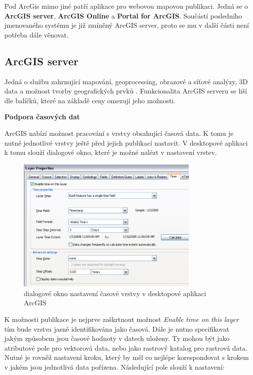 Pod ArcGis mimo jiné patří aplikace pro webovou mapovou publikaci. Jedná se o \textbf{ArcGIS server}, \textbf{ArcGIS Online} a \textbf{Portal for ArcGIS}. Součástí posledního jmenovaného systému je již zmíněný ArcGIS server, proto se mu v další části není potřeba dále věnovat.

\newpage
\subsection{ArcGIS server}

Jedná o službu zahrnující mapování, geoprocessing, obrazové a síťové analýzy, 3D data a možnost tvorby geografických prvků \cite{arcgis-publishing-service}. Funkcionalita ArcGIS serveru se liší dle balíčků, které na základě ceny omezují jeho možnosti.   

\bigskip
\noindent
\textbf{Podpora časových dat}
 
ArcGIS nabízí možnost pracování s vrstvy obsahující časová data. K tomu je nutné jednotlivé vrstvy ještě před jejich publikací nastavit. V desktopové aplikaci k tomu slouží dialogové okno, které je možné nalézt v nastavení vrstev.

\begin{figure}[h!]
	\centering
	\includegraphics[width=0.8\textwidth]{../img/arcgis-layer-edit.png}
	\caption{dialogové okno nastavení časové vrstvy v desktopové aplikaci ArcGIS}
	\label{fig:arcgis-time-settings}
\end{figure}

K možnosti publikace je nejprve zaškrtnout možnost \textit{Enable time on this layer} tím bude vrstva jasně identifikována jako časová. Dále je nutno specifikovat jakým způsobem jsou časové hodnoty v datech uloženy. Ty mohou být jako atributové pole pro vektorová data, nebo jako rastrový katalog pro rastrová data. Nutné je rovněž nastavení kroku, který by měl co nejlépe korespondovat s krokem v jakém jsou jednotlivá data pořízena. Následující pole slouží k nastavení:

